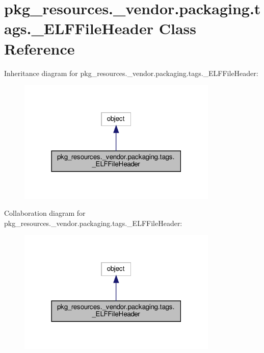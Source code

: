 \hypertarget{classpkg__resources_1_1__vendor_1_1packaging_1_1tags_1_1__ELFFileHeader}{}\section{pkg\+\_\+resources.\+\_\+vendor.\+packaging.\+tags.\+\_\+\+E\+L\+F\+File\+Header Class Reference}
\label{classpkg__resources_1_1__vendor_1_1packaging_1_1tags_1_1__ELFFileHeader}


Inheritance diagram for pkg\+\_\+resources.\+\_\+vendor.\+packaging.\+tags.\+\_\+\+E\+L\+F\+File\+Header\+:
\nopagebreak
\begin{figure}[H]
\begin{center}
\leavevmode
\includegraphics[width=270pt]{classpkg__resources_1_1__vendor_1_1packaging_1_1tags_1_1__ELFFileHeader__inherit__graph}
\end{center}
\end{figure}


Collaboration diagram for pkg\+\_\+resources.\+\_\+vendor.\+packaging.\+tags.\+\_\+\+E\+L\+F\+File\+Header\+:
\nopagebreak
\begin{figure}[H]
\begin{center}
\leavevmode
\includegraphics[width=270pt]{classpkg__resources_1_1__vendor_1_1packaging_1_1tags_1_1__ELFFileHeader__coll__graph}
\end{center}
\end{figure}
